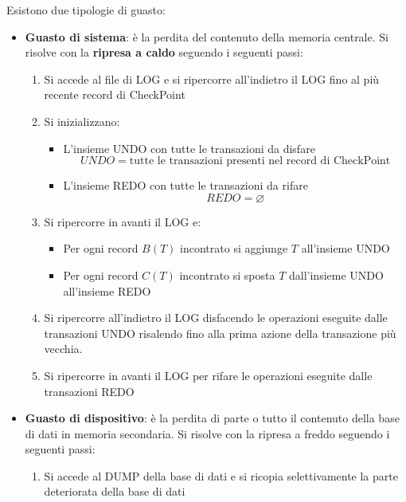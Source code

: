 \documentclass[a4paper,twoside]{article}
\begin{document}
\vspace{1em}
\noindent
Esistono due tipologie di guasto:
\begin{itemize}
  \item \textbf{Guasto di sistema}: è la perdita del contenuto della memoria centrale.
    Si risolve con la \textbf{ripresa a caldo} seguendo i seguenti passi:
    \begin{enumerate}
      \item Si accede al file di LOG e si ripercorre all'indietro il LOG fino al più
        recente record di CheckPoint

      \item Si inizializzano:
        \begin{itemize}
          \item L'insieme UNDO con tutte le transazioni da disfare
            \[
              UNDO = \text{tutte le transazioni presenti nel record di CheckPoint}
            \] 
          \item L'insieme REDO con tutte le transazioni da rifare
            \[
              REDO = \varnothing
            \] 
        \end{itemize}

      \item Si ripercorre in avanti il LOG e:
        \begin{itemize}
          \item Per ogni record \( B(T) \) incontrato si aggiunge \( T \) all'insieme
            UNDO

          \item Per ogni record \( C(T) \) incontrato si sposta \( T \) dall'insieme UNDO
            all'insieme REDO
        \end{itemize}

      \item Si ripercorre all'indietro il LOG disfacendo le operazioni eseguite dalle
        transazioni UNDO risalendo fino alla prima azione della transazione più vecchia.

      \item Si ripercorre in avanti il LOG per rifare le operazioni eseguite dalle
        transazioni REDO
    \end{enumerate}

  \item \textbf{Guasto di dispositivo}: è la perdita di parte o tutto il contenuto
    della base di dati in memoria secondaria. Si risolve con la ripresa a freddo
    seguendo i seguenti passi:
    \begin{enumerate}
      \item Si accede al DUMP della base di dati e si ricopia selettivamente la parte
        deteriorata della base di dati


\end{enumerate}
\end{itemize}
\end{document}
